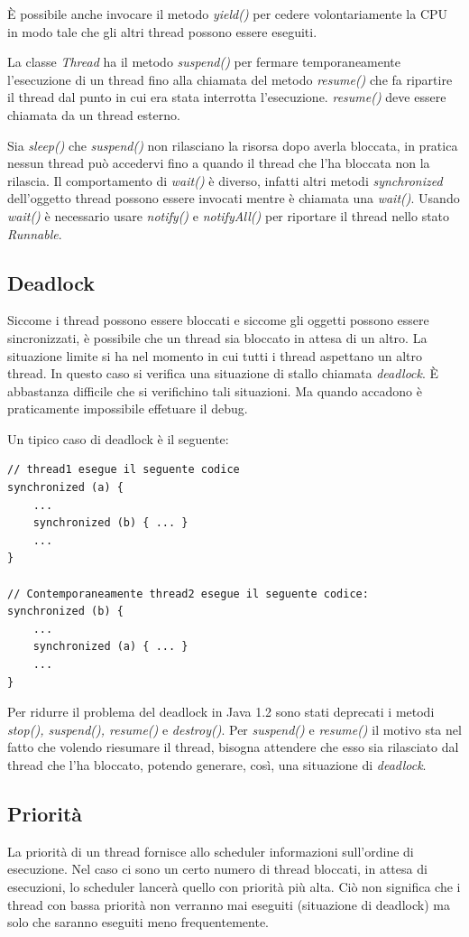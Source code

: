 \documentclass[12pt]{report}
\begin{document}
È possibile anche invocare il metodo \textit{yield()} per cedere volontariamente la CPU in modo tale che gli altri thread possono essere eseguiti.

La classe \textit{Thread} ha il metodo \textit{suspend()} per fermare temporaneamente l'esecuzione di un thread fino alla chiamata del metodo \textit{resume()} che fa ripartire il thread dal punto in cui era stata interrotta l'esecuzione. \textit{resume()} deve essere chiamata da un thread esterno.

Sia \textit{sleep()} che \textit{suspend()} non rilasciano la risorsa dopo averla bloccata, in pratica nessun thread può accedervi fino a quando il thread che l'ha bloccata non la rilascia. Il comportamento di \textit{wait()} è diverso, infatti altri metodi \textit{synchronized} dell'oggetto thread possono essere invocati mentre è chiamata una \textit{wait()}. Usando \textit{wait()} è necessario usare \textit{notify()} e \textit{notifyAll()} per riportare il thread nello stato \textit{Runnable}.
\subsection{Deadlock}
Siccome i thread possono essere bloccati e siccome gli oggetti possono essere sincronizzati, è possibile che un thread sia bloccato in attesa di un altro. La situazione limite si ha nel momento in cui tutti i thread aspettano un altro thread. In questo caso si verifica una situazione di stallo chiamata \textit{deadlock}. È abbastanza difficile che si verifichino tali situazioni. Ma quando accadono è praticamente impossibile effetuare il debug.

Un tipico caso di deadlock è il seguente:
\begin{lstlisting}[style=javastyle]
// thread1 esegue il seguente codice
synchronized (a) {
	...
	synchronized (b) { ... }
	...
}

// Contemporaneamente thread2 esegue il seguente codice:
synchronized (b) {
	...
	synchronized (a) { ... }
	...
}
\end{lstlisting}
Per ridurre il problema del deadlock in Java 1.2 sono stati deprecati i metodi \textit{stop(), suspend(), resume()} e \textit{destroy()}. Per \textit{suspend()} e \textit{resume()} il motivo sta nel fatto che volendo riesumare il thread, bisogna attendere che esso sia rilasciato dal thread che l'ha bloccato, potendo generare, così, una situazione di \textit{deadlock}.
\subsection{Priorità}
La priorità di un thread fornisce allo scheduler informazioni sull'ordine di esecuzione. Nel caso ci sono un certo numero di thread bloccati, in attesa di esecuzioni, lo scheduler lancerà quello con priorità più alta. Ciò non significa che i thread con bassa priorità non verranno mai eseguiti (situazione di deadlock) ma solo che saranno eseguiti meno frequentemente.
\end{document}

